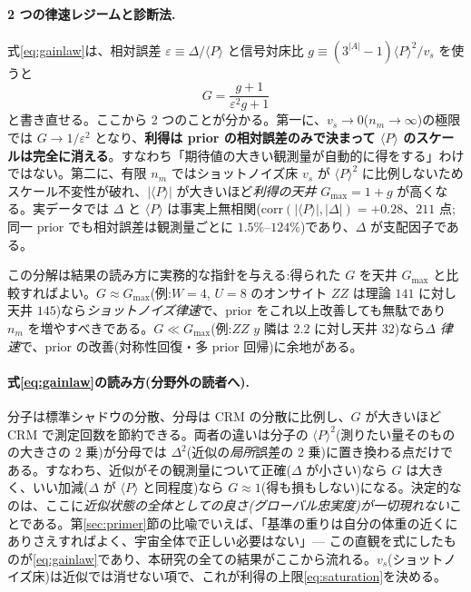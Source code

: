 \documentclass[11pt,a4paper]{ltjsarticle}
\newcommand{\ev}[1]{\langle #1\rangle}
\begin{document}
\paragraph{2 つの律速レジームと診断法.}式\eqref{eq:gainlaw}は、相対誤差 $\varepsilon\equiv\Delta/\ev{P}$ と信号対床比 $g\equiv(3^{|A|}-1)\ev{P}^2/v_s$ を使うと
\begin{equation}
  G = \frac{g+1}{\varepsilon^2 g + 1}
  \label{eq:tworegime}
\end{equation}
と書き直せる。ここから 2 つのことが分かる。第一に、$v_s\to0$($n_m\to\infty$)の極限では $G\to1/\varepsilon^2$ となり、\textbf{利得は prior の相対誤差のみで決まって $\ev{P}$ のスケールは完全に消える}。すなわち「期待値の大きい観測量が自動的に得をする」わけではない。第二に、有限 $n_m$ ではショットノイズ床 $v_s$ が $\ev{P}^2$ に比例しないためスケール不変性が破れ、$|\ev{P}|$ が大きいほど\emph{利得の天井} $G_{\max}=1+g$ が高くなる。実データでは $\Delta$ と $\ev{P}$ は事実上無相関($\mathrm{corr}(|\ev{P}|,|\Delta|)=+0.28$、$211$ 点;同一 prior でも相対誤差は観測量ごとに $1.5\%$--$124\%$)であり、$\Delta$ が支配因子である。

この分解は結果の読み方に実務的な指針を与える:得られた $G$ を天井 $G_{\max}$ と比較すればよい。$G\approx G_{\max}$(例:$W=4$, $U=8$ のオンサイト $ZZ$ は理論 $141$ に対し天井 $145$)なら\emph{ショットノイズ律速}で、prior をこれ以上改善しても無駄であり $n_m$ を増やすべきである。$G\ll G_{\max}$(例:$ZZ$ $y$ 隣は $2.2$ に対し天井 $32$)なら\emph{$\Delta$ 律速}で、prior の改善(対称性回復・多 prior 回帰)に余地がある。

\paragraph{式\eqref{eq:gainlaw}の読み方(分野外の読者へ).}分子は標準シャドウの分散、分母は CRM の分散に比例し、$G$ が大きいほど CRM で測定回数を節約できる。両者の違いは分子の $\ev{P}^2$(測りたい量そのものの大きさの 2 乗)が分母では $\Delta^2$(近似の\emph{局所}誤差の 2 乗)に置き換わる点だけである。すなわち、近似がその観測量について正確($\Delta$ が小さい)なら $G$ は大きく、いい加減($\Delta$ が $\ev{P}$ と同程度)なら $G\approx1$(得も損もしない)になる。決定的なのは、ここに\emph{近似状態の全体としての良さ(グローバル忠実度)が一切現れない}ことである。第\ref{sec:primer}節の比喩でいえば、「基準の重りは自分の体重の近くにありさえすればよく、宇宙全体で正しい必要はない」— この直観を式にしたものが\eqref{eq:gainlaw}であり、本研究の全ての結果がここから流れる。$v_s$(ショットノイズ床)は近似では消せない項で、これが利得の上限\eqref{eq:saturation}を決める。
\end{document}
